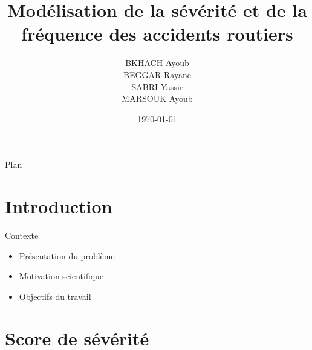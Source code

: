 \documentclass[11pt]{beamer}
\title{Modélisation de la sévérité et de la fréquence des accidents
routiers}
\author[Équipe 15]{%
BKHACH Ayoub\\
BEGGAR Rayane\\
SABRI Yassir\\
MARSOUK Ayoub
}
\institute[ENSIMAG]{%
ENSIMAG\\[0.5em]
\textbf{Encadrant :} Christophe Dutang
}
\date{\today}
\begin{document}
\begin{frame}
  \titlepage
\end{frame}

\begin{frame}{Plan}
  \tableofcontents
\end{frame}

\section{Introduction}

\begin{frame}{Contexte}
\begin{itemize}
  \item Présentation du problème
  \item Motivation scientifique
  \item Objectifs du travail
\end{itemize}
\end{frame}

\section{Score de sévérité}
\end{document}
